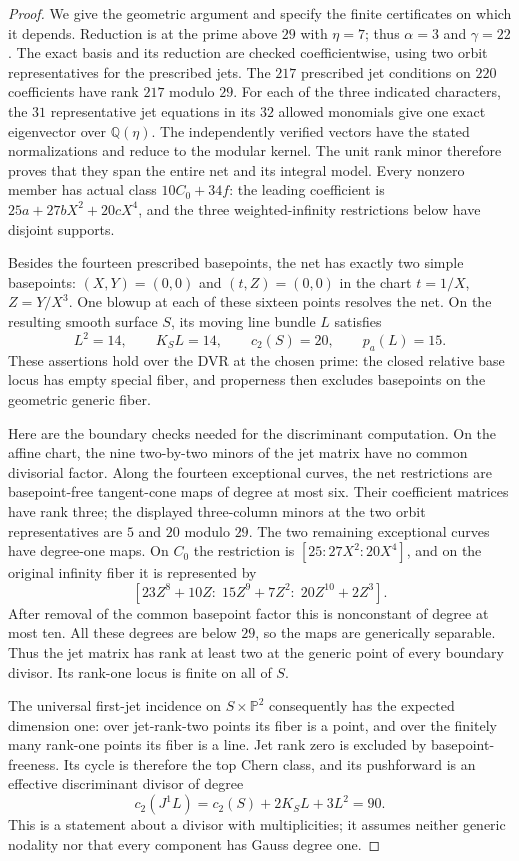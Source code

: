 \begin{proof}
We give the geometric argument and specify the finite certificates on
which it depends. Reduction is at the prime above $29$ with $\eta=7$;
thus $\alpha=3$ and $\gamma=22$. The exact basis and its reduction are checked
coefficientwise, using two orbit representatives for the prescribed jets.
The $217$ prescribed jet conditions on $220$ coefficients have rank
$217$ modulo $29$. For each of the three indicated characters, the
$31$ representative jet equations in its $32$ allowed monomials give
one exact eigenvector over $\mathbb Q(\eta)$. The independently verified
vectors have the stated normalizations and reduce to the modular kernel.
The unit rank minor therefore proves that they span the entire net and
its integral model. Every nonzero member has actual class
$10C_0+34f$: the leading coefficient is $25a+27bX^2+20cX^4$, and the
three weighted-infinity restrictions below have disjoint supports.

Besides the fourteen prescribed basepoints, the net has exactly two
simple basepoints: $(X,Y)=(0,0)$ and $(t,Z)=(0,0)$ in the chart
$t=1/X$, $Z=Y/X^3$. One blowup at each of these sixteen points resolves
the net. On the resulting smooth surface $S$, its moving line bundle $L$
satisfies
\[
 L^2=14,\qquad K_S L=14,\qquad c_2(S)=20,\qquad p_a(L)=15.
\]
These assertions hold over the DVR at the chosen prime: the closed
relative base locus has empty special fiber, and properness then excludes
basepoints on the geometric generic fiber.

Here are the boundary checks needed for the discriminant computation.
On the affine chart, the nine two-by-two minors of the jet matrix have
no common divisorial factor. Along the fourteen exceptional curves, the
net restrictions are basepoint-free tangent-cone maps of degree at most
six. Their coefficient matrices have rank three; the displayed
three-column minors at the two orbit representatives are $5$ and $20$
modulo $29$. The two remaining exceptional curves have degree-one maps.
On $C_0$ the restriction is $[25:27X^2:20X^4]$, and on the original
infinity fiber it is represented by
\[
 [23Z^8+10Z:\;15Z^9+7Z^2:\;20Z^{10}+2Z^3].
\]
After removal of the common basepoint factor this is nonconstant of
degree at most ten. All these degrees are below $29$, so the maps are
generically separable. Thus the jet matrix has rank at least two at the
generic point of every boundary divisor. Its rank-one locus is finite
on all of $S$.

The universal first-jet incidence on $S\times\mathbb P^2$ consequently
has the expected dimension one: over jet-rank-two points its fiber is a
point, and over the finitely many rank-one points its fiber is a line.
Jet rank zero is excluded by basepoint-freeness. Its cycle is therefore
the top Chern class, and its pushforward is an effective discriminant
divisor of degree
\[
 c_2(J^1L)=c_2(S)+2K_SL+3L^2=90.
\]
This is a statement about a divisor with multiplicities; it assumes
neither generic nodality nor that every component has Gauss degree one.


\end{proof}
